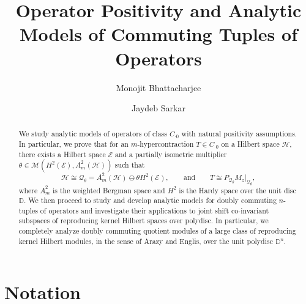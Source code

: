\documentclass[12pt]{amsart}
\begin{document}
\title[Operator Positivity and Analytic Models]{Operator Positivity and Analytic Models of Commuting Tuples of Operators}

\author[Monojit Bhattacharjee]{Monojit Bhattacharjee}
\address{Indian Institute of Science, Department of Mathematics, Bangalore, 560012, India}

\author[Jaydeb Sarkar]{Jaydeb Sarkar}
\address{Indian Statistical Institute, Statistics and Mathematics Unit, 8th Mile, Mysore Road, Bangalore, 560059, India}



\begin{abstract}
We study analytic models of operators of class $C_{\cdot 0}$ with
natural positivity assumptions. In particular, we prove that for an
$m$-hypercontraction $T \in C_{\cdot 0}$ on a Hilbert space ${\mathcal{H}}$,
there exists a Hilbert space ${\mathcal{E}}$ and a partially isometric
multiplier $\theta \in {\mathcal{M}}(H^2({\mathcal{E}}), A^2_m({\mathcal{H}}))$ such that
\[{\mathcal{H}} \cong {\mathcal{Q}}_{\theta} = A^2_m({\mathcal{H}}) \ominus \theta H^2({\mathcal{E}}), \quad \quad \mbox{and} \quad \quad T \cong
P_{{\mathcal{Q}}_{\theta}} M_z|_{{\mathcal{Q}}_{\theta}},\]where $A^2_m$ is the
weighted Bergman space and $H^2$ is the Hardy space over the unit
disc ${\mathbb{D}}$. We then proceed to study and develop analytic models for
doubly commuting $n$-tuples of operators and investigate their
applications to joint shift co-invariant subspaces of reproducing
kernel Hilbert spaces over polydisc. In particular, we completely
analyze doubly commuting quotient modules of a large class of
reproducing kernel Hilbert modules, in the sense of Arazy and
Englis, over the unit polydisc ${\mathbb{D}}^n$.
\end{abstract}

\maketitle

\section*{Notation}
\end{document}
